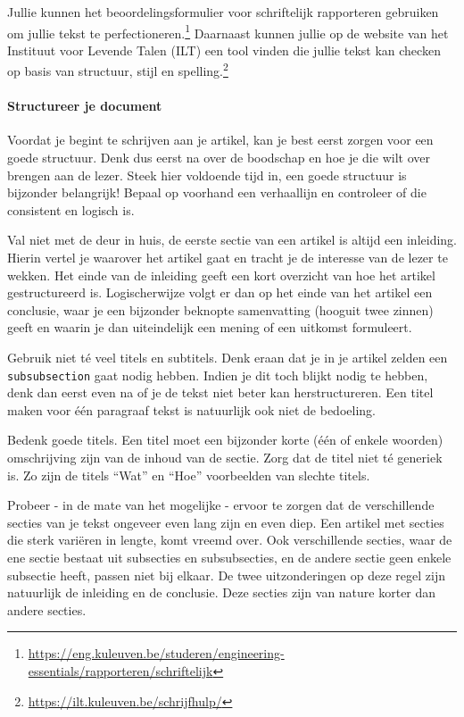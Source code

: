 \documentclass[a4paper]{article}
\begin{document}
Jullie kunnen het beoordelingsformulier voor schriftelijk rapporteren gebruiken om jullie tekst te perfectioneren.\footnote{\url{https://eng.kuleuven.be/studeren/engineering-essentials/rapporteren/schriftelijk}}
Daarnaast kunnen jullie op de website van het Instituut voor Levende Talen (ILT) een tool vinden die jullie tekst kan checken op basis van structuur, stijl en spelling.\footnote{\url{https://ilt.kuleuven.be/schrijfhulp/}}


\paragraph{Structureer je document}

Voordat je begint te schrijven aan je artikel, kan je best eerst zorgen voor een goede structuur.
Denk dus eerst na over de boodschap en hoe je die wilt over brengen aan de lezer.
Steek hier voldoende tijd in, een goede structuur is bijzonder belangrijk!
Bepaal op voorhand een verhaallijn en controleer of die consistent en logisch is.

Val niet met de deur in huis, de eerste sectie van een artikel is altijd een inleiding.
Hierin vertel je waarover het artikel gaat en tracht je de interesse van de lezer te wekken.
Het einde van de inleiding geeft een kort overzicht van hoe het artikel gestructureerd is.
Logischerwijze volgt er dan op het einde van het artikel een conclusie, waar je een bijzonder beknopte samenvatting (hooguit twee zinnen) geeft en waarin je dan uiteindelijk een mening of een uitkomst formuleert.

Gebruik niet t\'e veel titels en subtitels.
Denk eraan dat je in je artikel zelden een \texttt{\\subsubsection} gaat nodig hebben.
Indien je dit toch blijkt nodig te hebben, denk dan eerst even na of je de tekst niet beter kan herstructureren.
Een titel maken voor \'e\'en paragraaf tekst is natuurlijk ook niet de bedoeling.

Bedenk goede titels.
Een titel moet een bijzonder korte (\'e\'en of enkele woorden) omschrijving zijn van de inhoud van de sectie.
Zorg dat de titel niet t\'e generiek is.
Zo zijn de titels ``Wat'' en ``Hoe'' voorbeelden van slechte titels.

Probeer - in de mate van het mogelijke - ervoor te zorgen dat de verschillende secties van je tekst ongeveer even lang zijn en even diep.
Een artikel met secties die sterk vari\"eren in lengte, komt vreemd over.
Ook verschillende secties, waar de ene sectie bestaat uit subsecties en subsubsecties, en de andere sectie geen enkele subsectie heeft, passen niet bij elkaar.
De twee uitzonderingen op deze regel zijn natuurlijk de inleiding en de conclusie.
Deze secties zijn van nature korter dan andere secties.
\end{document}
